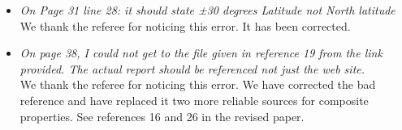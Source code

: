 \documentclass[10pt, a4paper]{article}
\begin{document}
\begin{itemize}
    \item \emph{On Page 31 line 28: it should state ±30 degrees Latitude not North latitude} \\

        We thank the referee for noticing this error.  It has been corrected. 

    \item \emph{On page 38, I could not get to the file given in reference 19 from the link provided. The actual report should be referenced not just the web site.} \\

        We thank the referee for noticing this error.  We have corrected the bad reference and have replaced it two more reliable sources for composite properties.  See references 16 and 26 in the revised paper.
    \end{itemize}
\end{document}
